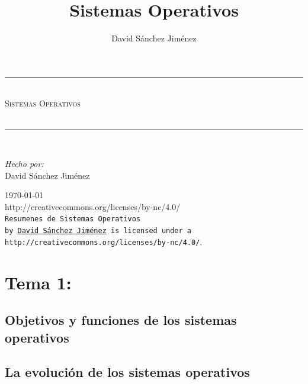 \documentclass[10pt,a4paper,spanish]{report}
\title{Sistemas Operativos}
\author{David Sánchez Jiménez}
\newcommand{\HRule}{\rule{\linewidth}{0.5mm}} %
\begin{document}
  \begin{titlepage}
    \begin{center}
      \HRule \\[0.8cm]
      \textsc{\huge Sistemas Operativos\\[0.5cm]}\\[1.6cm]
      \HRule \\[1cm]
      \begin{flushleft}
        \emph{Hecho por:}\\
         David Sánchez Jiménez
      \end{flushleft}
      \vspace{12cm}
      \large{\today}\\
      \vspace{0.5cm}
      {http://creativecommons.org/licenses/by-nc/4.0/}\\[0.5cm]
      \texttt{Resumenes de Sistemas Operativos\\ by
      \href{mailto:dasaji92@gmail.com}{David Sánchez Jiménez}
      is licensed under a 
      {http://creativecommons.org/licenses/by-nc/4.0/}}.\\[3mm]
    \end{center}
  \end{titlepage}

  \tableofcontents
  \newpage

  \chapter{Tema 1: }


  \section{Objetivos y funciones de los sistemas operativos}

  \noindent


  \section{La evolución de los sistemas operativos}
\end{document}
